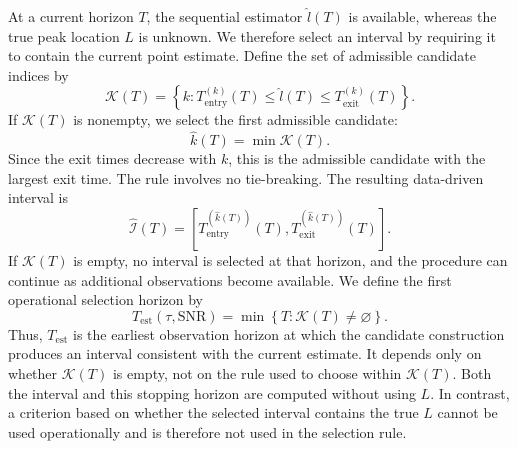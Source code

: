 \documentclass[12pt,a4paper]{article}
\begin{document}
At a current horizon $T$, the sequential estimator
$\widehat l(T)$ is available, whereas the true peak location $L$
is unknown. We therefore select an interval by requiring it to contain
the current point estimate. Define the set of admissible candidate
indices by
\begin{equation}
	\mathcal K(T)
	=
	\left\{
	k:
	T_{\mathrm{entry}}^{(k)}(T)
	\leq \widehat l(T)
	\leq T_{\mathrm{exit}}^{(k)}(T)
	\right\}.
	\label{eq:admissible-candidates}
\end{equation}
If $\mathcal K(T)$ is nonempty, we select the first admissible
candidate:
\begin{equation}
	\widehat k(T)
	=
	\min\mathcal K(T).
	\label{eq:selected-candidate}
\end{equation}
Since the exit times decrease with $k$, this is the admissible
candidate with the largest exit time. The rule involves no
tie-breaking. The resulting data-driven interval is
\begin{equation}
	\widehat{\mathcal I}(T)
	=
	\left[
	T_{\mathrm{entry}}^{(\widehat k(T))}(T),
	T_{\mathrm{exit}}^{(\widehat k(T))}(T)
	\right].
	\label{eq:selected-peak-interval}
\end{equation}
If $\mathcal K(T)$ is empty, no interval is selected at that horizon,
and the procedure can continue as additional observations become
available.
We define the first operational selection horizon by
\begin{equation}
	T_{\mathrm{est}}(\tau,\mathrm{SNR})
	=
	\min\left\{
	T:
	\mathcal K(T)\neq\varnothing
	\right\}.
	\label{eq:T-est}
\end{equation}
Thus, $T_{\mathrm{est}}$ is the earliest observation horizon at which
the candidate construction produces an interval consistent with the
current estimate. It depends only on whether $\mathcal K(T)$ is empty,
not on the rule used to choose within $\mathcal K(T)$. Both the interval
and this stopping horizon are computed without using $L$. In contrast,
a criterion based on whether the selected interval contains the true $L$
cannot be used operationally and is therefore not used in the selection
rule.
\end{document}
